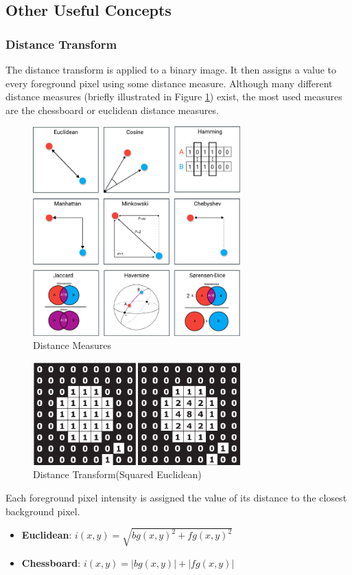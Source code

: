 \documentclass[a4paper, 12pt]{report}
\begin{document}
\subsection{Other Useful Concepts}
\subsubsection{Distance Transform}
The distance transform is applied to a binary image. It then assigns a value to every foreground pixel using some distance measure. Although many different distance measures (briefly illustrated in Figure \ref{fig:distances}) exist, the most used measures are the chessboard or euclidean distance measures.
\begin{figure}[ht]
    \centering
    \includegraphics[width=8cm]{distances.png}
    \caption{Distance Measures~\cite{distance_measures}}
    \label{fig:distances}
\end{figure}

\begin{figure}[ht]
    \centering
    \includegraphics[width=8cm]{distance_transform.png}
    \caption{Distance Transform(Squared Euclidean)~\cite{distance_transform}}
    \label{fig:dt}
\end{figure}
Each foreground pixel intensity is assigned the value of its distance to the closest background pixel.
\begin{itemize}
    \item \textbf{Euclidean}: $i(x,y)=\sqrt{bg(x,y)^2+fg(x,y)^2}$
    \item \textbf{Chessboard}: $i(x,y)=|bg(x,y)|+|fg(x,y)|$
\end{itemize}
\end{document}

